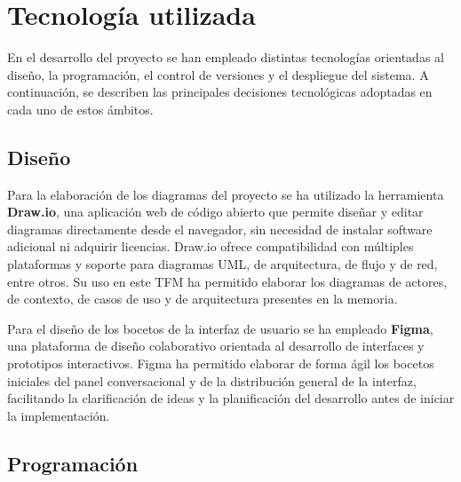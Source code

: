 \section{Tecnología utilizada}
\label{sec:tecnologia}

En el desarrollo del proyecto se han empleado distintas tecnologías orientadas al diseño, la programación, el control de versiones y el despliegue del sistema. A continuación, se describen las principales decisiones tecnológicas adoptadas en cada uno de estos ámbitos.

\subsection{Diseño}

Para la elaboración de los diagramas del proyecto se ha utilizado la herramienta \textbf{Draw.io}, una aplicación web de código abierto que permite diseñar y editar diagramas directamente desde el navegador, sin necesidad de instalar software adicional ni adquirir licencias. Draw.io ofrece compatibilidad con múltiples plataformas y soporte para diagramas UML, de arquitectura, de flujo y de red, entre otros. Su uso en este TFM ha permitido elaborar los diagramas de actores, de contexto, de casos de uso y de arquitectura presentes en la memoria.

Para el diseño de los bocetos de la interfaz de usuario se ha empleado \textbf{Figma}, una plataforma de diseño colaborativo orientada al desarrollo de interfaces y prototipos interactivos. Figma ha permitido elaborar de forma ágil los bocetos iniciales del panel conversacional y de la distribución general de la interfaz, facilitando la clarificación de ideas y la planificación del desarrollo antes de iniciar la implementación.

\begin{center}
\hspace{1.0cm}%
%
\end{center}

\subsection{Programación}

